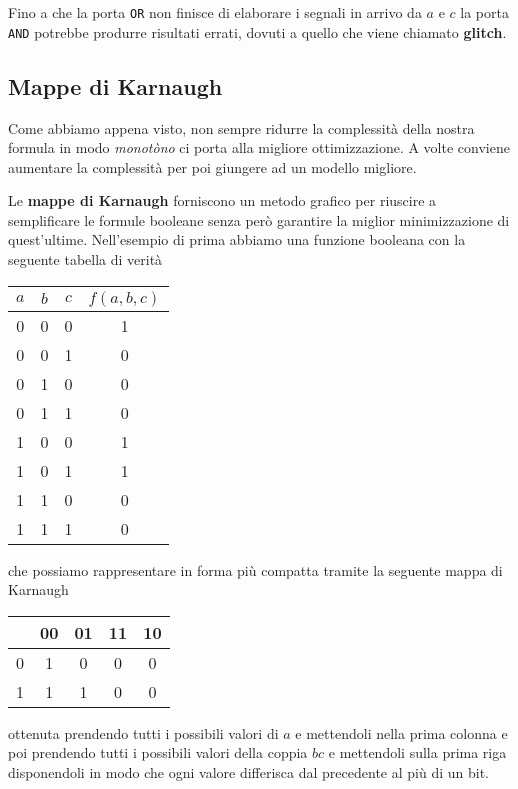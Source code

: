 Fino a che la porta \verb|OR| non finisce di elaborare i segnali in arrivo da $a$ e $c$ la porta
\verb|AND| potrebbe produrre risultati errati, dovuti a quello che viene chiamato \textbf{glitch}.

\subsection{Mappe di Karnaugh}
Come abbiamo appena visto, non sempre ridurre la complessità della nostra formula in modo
\emph{monotòno} ci porta alla migliore ottimizzazione. A volte conviene aumentare la complessità
per poi giungere ad un modello migliore.

Le \textbf{mappe di Karnaugh} forniscono un metodo grafico per riuscire a semplificare le formule
booleane senza però garantire la miglior minimizzazione di quest'ultime. Nell'esempio di prima
abbiamo una funzione booleana con la seguente tabella di verità
\begin{center}
	\begin{tabular}{c c c | c}
		$a$ & $b$ & $c$ & $f(a,b,c)$ \\ \hline
		0   & 0   & 0   & 1          \\
		0   & 0   & 1   & 0          \\
		0   & 1   & 0   & 0          \\
		0   & 1   & 1   & 0          \\
		1   & 0   & 0   & 1          \\
		1   & 0   & 1   & 1          \\
		1   & 1   & 0   & 0          \\
		1   & 1   & 1   & 0
	\end{tabular}
\end{center}
che possiamo rappresentare in forma più compatta tramite la seguente mappa di Karnaugh
\begin{center}
	\begin{tabular}{| c | c | c | c | c |}
		\hline
		\diagbox{$a$}{$bc$} & 00 & 01 & 11 & 10 \\ \hline
		0                   & 1  & 0  & 0  & 0  \\ \hline
		1                   & 1  & 1  & 0  & 0  \\ \hline
	\end{tabular}
\end{center}
ottenuta prendendo tutti i possibili valori di $a$ e mettendoli nella prima colonna e poi prendendo
tutti i possibili valori della coppia $bc$ e mettendoli sulla prima riga disponendoli in modo che
ogni valore differisca dal precedente al più di un bit.

